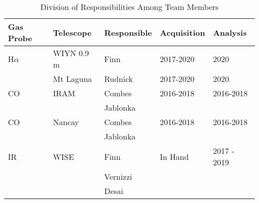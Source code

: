 \begin{table}[h!]
\small
\caption{Division of Responsibilities Among Team Members \label{datamanagement}}
\begin{tabular}{|p{1.1in}|p{1.1in}|p{1.1in}|p{1.1in}|p{1.1in}|}
\hline
{\bf Gas Probe} & {\bf Telescope} & {\bf Responsible} & {\bf
  Acquisition} & {\bf Analysis}\\

\hline
H$\alpha$ & WIYN 0.9 m &Finn & 2017-2020 & 2020 \\
& Mt Laguna &Rudnick & 2017-2020 & 2020 \\

\hline
CO & IRAM & Combes & 2016-2018 & 2016-2018 \\
  & & Jablonka & & \\
\hline
CO & Nancay & Combes & 2016-2018 & 2016-2018 \\
  & & Jablonka & & \\

\hline
IR  & WISE & Finn & In Hand & 2017 - 2019\\
  & & Vernizzi & & \\
  & & Desai & & \\
\hline
 
\end{tabular}
\end{table}
